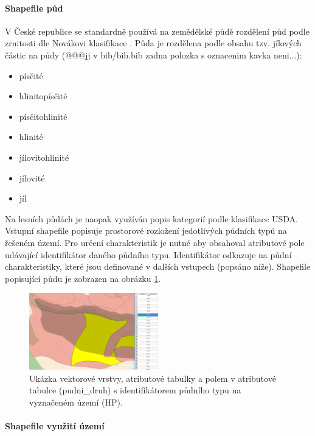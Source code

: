\paragraph{Shapefile půd} \label{sec:vstuppuda}


V České republice se standardně používá na zemědělské půdě rozdělení půd podle zrnitosti dle Novákovi klasifikace . Půda je rozdělena podle obsahu tzv. jílových částic na půdy \cite{kavka} (@@@jj v bib/bib.bib zadna polozka s oznacenim kavka neni...):
\begin{itemize} \itemsep 0pt
  \item písčité
  \item hlinitopísčité
  \item písčitohlinité
  \item hlinité
  \item jílovitohlinité
  \item jílovité
  \item jíl
\end{itemize}

Na lesních půdách je naopak využíván popis kategorií podle klasifikace USDA.
Vstupní shapefile popisuje prostorové rozložení jedotlivých půdních typů na řešeném území. Pro určení charakteristik je nutné aby obsahoval atributové pole udávající identifikátor daného půdního typu. Identifikátor odkazuje na půdní charakteristiky, které jsou definované v dalších vstupech (popsáno níže). Shapefile popisující půdu je zobrazen na obrázku \ref{fig:bykovicepuda}.
\begin{figure}
  \centering
  \includegraphics[width=0.5\textwidth]{./img/pudnityp.png}
  \caption{Ukázka vektorové vrstvy, atributové tabulky a polem v atributové tabulce (pudni\_druh) s identifikátorem půdního typu na vyznačeném území (HP).}
  \label{fig:bykovicepuda}
\end{figure}



\paragraph{Shapefile využití území} \label{sec:vstupvegetace}

